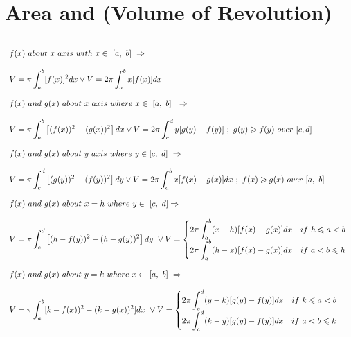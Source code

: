 \documentclass{article}
\begin{document}
 \section{Area and (Volume of Revolution)}
\[
\begin{array}{>{\displaystyle}l}
    \\
    f( x) \ about\ x\ axis\ with\ x\in \ [ a,\ b] \ \Rightarrow \\
    \\
    V=\pi \int ^{b}_{a}[ f( x)]^{2} dx\lor V=2\pi \int ^{b}_{a} x[ f( x)] dx\\
    \\
    f( x) \ and\ g( x) \ about\ x\ axis\ where\ x\in \ [ a,\ b] \ \ \Rightarrow \\
    \\
    V=\pi \int ^{b}_{a}\left[( f( x))^{2} -( g( x))^{2}\right] dx\lor V=2\pi \int ^{d}_{c} y[ g( y) -f( y)] \ ;\ g( y) \geqslant f( y) \ over\ [ c,d] \ \\
    \\
    f( x) \ and\ g( x) \ about\ y\ axis\ where\ y\in [ c,\ d] \ \Rightarrow \\
    \\
    V=\pi \int ^{d}_{c}\left[( g( y))^{2} -( f( y))^{2}\right] dy\lor V=2\pi \int ^{b}_{a} x[ f( x) -g( x)] dx\ ;\ f( x) \geqslant g( x) \ over\ [ a,\ b]\\
    \\
    f( x) \ and\ g( x) \ about\ x=h\ where\ y\in \ [ c,\ d] \Rightarrow \\
    \\
    V=\pi \int ^{d}_{c}\left[( h-f( y))^{2} -( h-g( y))^{2}\right] dy\ \lor V=\begin{cases}
    \displaystyle
    2\pi \int ^{b}_{a}( x-h)[ f( x) -g( x)] dx & if\ h\leqslant a< b\\
    \displaystyle
    2\pi \int ^{b}_{a}( h-x)[ f( x) -g( x)] dx & if\ a< b\leqslant h
    \end{cases} \ \\
    \\
    f( x) \ and\ g( x) \ about\ y=k\ where\ x\in \ [ a,\ b] \ \Rightarrow \\
    \\
    V=\pi \int ^{b}_{a}[ k-f( x))^{2} -( k-g( x))^{2}] dx\ \lor V=\begin{cases}
    \displaystyle
    2\pi \int ^{d}_{c}( y-k)[ g( y) -f( y)] dx & if\ k\leqslant a< b\\
    \displaystyle
    2\pi \int ^{d}_{c}( k-y)[ g( y) -f( y)] dx & if\ a< b\leqslant k

\end{cases}
\end{array}\]
\end{document}
